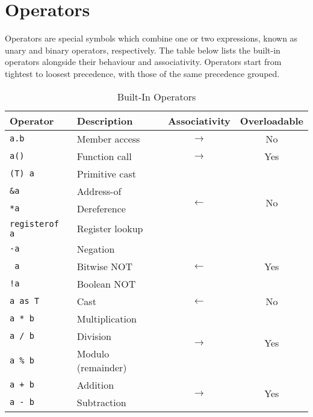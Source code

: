 \documentclass{article}
\begin{document}
    \section{Operators}

    Operators are special symbols which combine one or two expressions, known as unary and binary operators, respectively.
    The table below lists the built-in operators alongside their behaviour and associativity.
    Operators start from tightest to loosest precedence, with those of the same precedence grouped.

    \begin{table}[h]
        \centering
        \caption{Built-In Operators}
        \begin{tabular}{|l|l|c|c|}
            \hline
            \textbf{Operator} & \textbf{Description} & \textbf{Associativity} & \textbf{Overloadable} \\
            \hline
            \texttt{a.b} & Member access & \(\longrightarrow\) & No \\
            \hline
            \texttt{a()} & Function call & \(\longrightarrow\) & Yes \\
            \hline
            \texttt{(T) a} & Primitive cast & \multirow{4}{*}{\(\longleftarrow\)} & \multirow{4}{*}{No} \\
            \texttt{\&a} & Address-of & & \\
            \texttt{*a} & Dereference & & \\
            \texttt{registerof a} & Register lookup & & \\
            \hline
            \texttt{-a} & Negation & \multirow{3}{*}{\(\longleftarrow\)} & \multirow{3}{*}{Yes} \\
            \texttt{~a} & Bitwise NOT & & \\
            \texttt{!a} & Boolean NOT & & \\
            \hline
            \texttt{a as T} & Cast & \(\longleftarrow\) & No \\
            \hline
            \texttt{a * b} & Multiplication & \multirow{3}{*}{\(\longrightarrow\)} & \multirow{3}{*}{Yes} \\
            \texttt{a / b} & Division & & \\
            \texttt{a \% b} & Modulo (remainder) & & \\
            \hline
            \texttt{a + b} & Addition & \multirow{2}{*}{\(\longrightarrow\)} & \multirow{2}{*}{Yes} \\
            \texttt{a - b} & Subtraction & & \\

\end{tabular}
\end{table}
\end{document}

